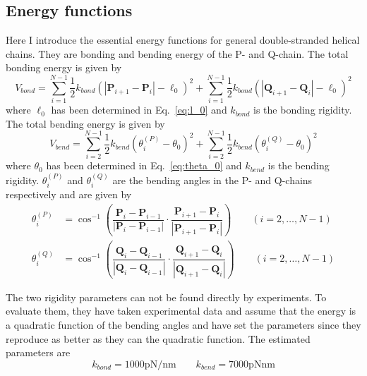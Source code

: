 \documentclass[a4paper,10pt]{article}
\begin{document}
\subsection{Energy functions}
Here I introduce the essential energy functions for general double-stranded helical chains.
They are bonding and bending energy of the P- and Q-chain.
The total bonding energy is given by
\begin{equation}\label{eq:bond}
V_{bond}=\sum_{i=1}^{N-1}\dfrac{1}{2}k_{bond}\left(\left|\textbf{P}_{i+1}-\textbf{P}_{i}\right|-\ell_0\right)^2+\sum_{i=1}^{N-1}\dfrac{1}{2}k_{bond}\left(\left|\textbf{Q}_{i+1}-\textbf{Q}_{i}\right|-\ell_0\right)^2
\end{equation}
where $\ell_0$ has been determined in Eq.~\ref{eq:l_0} and $k_{bond}$ is the bonding rigidity.
The total bending energy is given by
\begin{equation}\label{eq:bend}
V_{bend}=\sum_{i=2}^{N-1}\dfrac{1}{2}k_{bend}\left(\theta_i^{(P)}-\theta_0\right)^2+\sum_{i=2}^{N-1}\dfrac{1}{2}k_{bend}\left(\theta_i^{(Q)}-\theta_0\right)^2
\end{equation}
where $\theta_0$ has been determined in Eq.~\ref{eq:theta_0} and $k_{bend}$ is the bending rigidity.
$\theta_i^{(P)}$ and $\theta_i^{(Q)}$ are the bending angles in the P- and Q-chains respectively and are given by~\cite{old}
\begin{equation}
\begin{split}
\theta_i^{(P)} & =\cos^{-1}\left(\dfrac{\textbf{P}_{i}-\textbf{P}_{i-1}}{\left|\textbf{P}_{i}-\textbf{P}_{i-1}\right|}\cdot\dfrac{\textbf{P}_{i+1}-\textbf{P}_{i}}{\left|\textbf{P}_{i+1}-\textbf{P}_{i}\right|}\right)\qquad \left(i=2,\dots,N-1\right) \\
\theta_i^{(Q)} & =\cos^{-1}\left(\dfrac{\textbf{Q}_{i}-\textbf{Q}_{i-1}}{\left|\textbf{Q}_{i}-\textbf{Q}_{i-1}\right|}\cdot\dfrac{\textbf{Q}_{i+1}-\textbf{Q}_{i}}{\left|\textbf{Q}_{i+1}-\textbf{Q}_{i}\right|}\right)\qquad \left(i=2,\dots,N-1\right)
\end{split}
\end{equation}

The two rigidity parameters can not be found directly by experiments.
To evaluate them, they have taken experimental data and assume that the energy is a quadratic function of the bending angles and have set the parameters since they reproduce as better as they can the quadratic function.
The estimated parameters are
\begin{equation}
k_{bond}=1000\text{pN/nm}\qquad k_{bend}=7000\text{pNnm}
\end{equation}
\end{document}
